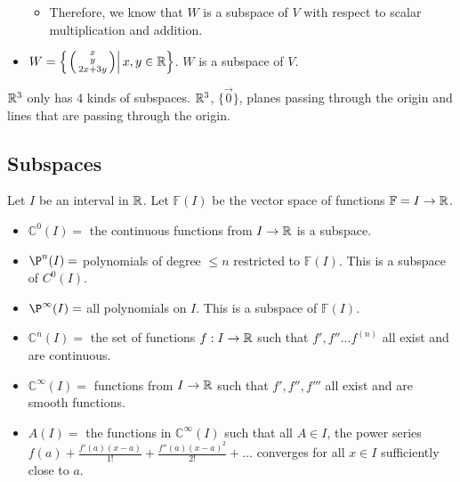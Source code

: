 \begin{itemize}
\begin{itemize}
      \item Therefore, we know that $W$ is a subspace of $V$ with respect to scalar multiplication and addition.
    \end{itemize}
    \item $W=\left\{\left.\left(\begin{smallmatrix}x\\y\\2x+3y\end{smallmatrix}\right)\right|x,y\in\mathbb{R}\right\}$. $W$ is a subspace of $V$.
  \end{itemize}

  $\mathbb{R}^3$ only has 4 kinds of subspaces. $\mathbb{R}^3$, $\{\vec{0}\}$, planes passing through the origin and lines that are passing through the origin.

  
\subsection{Subspaces}

  \begin{definition}
    Let $I$ be an interval in $\mathbb{R}$. Let $\mathbb{F}(I)$ be the vector space of functions $\mathbb{F}=I\to\mathbb{R}$.

    \begin{itemize}
      \item $\mathbb{C}^0(I)=$ the continuous functions from $I\to\mathbb{R}$ is a subspace.
      \item $\P^n(I)=$ polynomials of degree $\le n$ restricted to $\mathbb{F}(I)$. This is a subspace of $C^0(I)$.
      \item $\P^\infty(I)=$ all polynomials on $I$. This is a subspace of $\mathbb{F}(I)$.
      \item $\mathbb{C}^n (I)=$ the set of functions $f:I\to\mathbb{R}$ such that $f',f''...f^{(n)}$ all exist and are continuous.
      \item $\mathbb{C}^\infty(I)=$ functions from $I\to\mathbb{R}$ such that $f',f'',f'''$ all exist and are smooth functions.
      \item $A(I)=$ the functions in $\mathbb{C}^\infty(I)$ such that all $A\in I$, the power series $f(a)+\frac{f'(a)(x-a)}{1!}+\frac{f''(a)(x-a)^2}{2!}+\dots$ converges for all $x\in I$ sufficiently close to $a$.
    \end{itemize}
  \end{definition}

